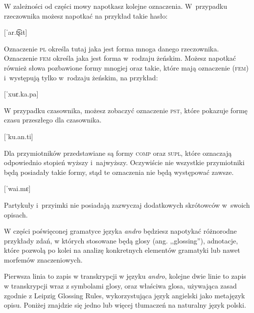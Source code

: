 \begin{spacing}{1.1}
W zależności od części mowy napotkasz kolejne oznaczenia. W~przypadku
rzeczownika możesz napotkać na przykład takie hasło:

[ˈar.t͡ʂit]
\skipline

Oznaczenie \textsc{pl} określa tutaj jaka jest forma mnoga danego rzeczownika.
Oznaczenie \textsc{fem} określa jaka jest forma w~rodzaju żeńskim. Możesz
napotkać również słowa pozbawione formy mnogiej oraz takie, które mają
oznaczenie (\textsc{fem}) i~występują tylko w~rodzaju żeńskim, na przykład:

[ˈxuɛ.ka.pa]
\skipline

W przypadku czasownika, możesz zobaczyć oznaczenie \textsc{pst}, które pokazuje
formę czasu przeszłego dla czasownika.

[ˈku.an.ti]
\skipline

Dla przymiotników przedstawiane są formy \textsc{comp} oraz \textsc{supl}, które
oznaczają odpowiednio stopień wyższy i~najwyższy. Oczywiście nie wszystkie
przymiotniki będą posiadały takie formy, stąd te oznaczenia nie będą występować
zawsze.

[ˈwai.mɛ]
\skipline

Partykuły i~przyimki nie posiadają zazwyczaj dodatkowych skrótowców w~swoich
opisach.

\skipline

W części poświęconej gramatyce języka \emph{andro} będziesz napotykać różnorodne
przykłady zdań, w których stosowane będą glosy (ang. ,,glossing''), adnotacje,
które pozwolą po kolei na analizę konkretnych elementów gramatyki lub nawet
morfemów znaczeniowych.

Pierwsza linia to zapis w transkrypcji w języku \emph{andro}, kolejne dwie linie
to zapis w transkrypcji wraz z symbolami glosy, oraz właściwa glosa, używająca
zasad zgodnie z Leipzig Glossing Rules, wykorzystująca język angielski jako
metajęzyk opisu. Poniżej znajdzie się jedno lub więcej tłumaczeń na naturalny
język polski.


\end{spacing}
